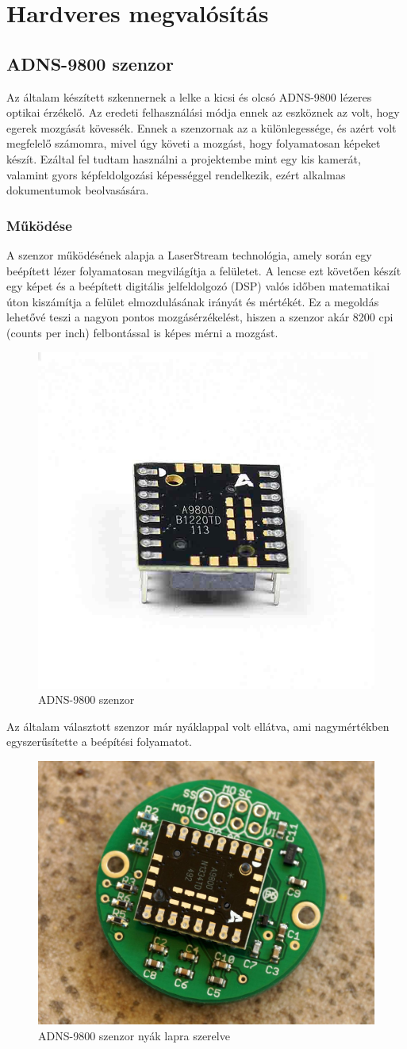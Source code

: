 \documentclass[]{thesis-ekf}
\theoremstyle{definition}
\theoremstyle{remark}
\begin{document}
\chapter{Hardveres megvalósítás}
\section{ADNS-9800 szenzor}
Az általam készített szkennernek a lelke a kicsi és olcsó ADNS-9800\cite{adns9800} lézeres optikai érzékelő. Az eredeti felhasználási módja ennek az eszköznek az volt, hogy egerek mozgását kövessék. Ennek a szenzornak az a különlegessége, és azért volt megfelelő számomra, mivel úgy követi a mozgást, hogy folyamatosan képeket készít. Ezáltal fel tudtam használni a projektembe mint egy kis kamerát, valamint gyors képfeldolgozási képességgel rendelkezik, ezért alkalmas dokumentumok beolvasására. 
\subsection{Működése}
 A szenzor működésének alapja a LaserStream technológia, amely során egy beépített lézer folyamatosan megvilágítja a felületet. A lencse ezt követően készít egy képet és a beépített digitális jelfeldolgozó (DSP) valós időben matematikai úton kiszámítja a felület elmozdulásának irányát és mértékét. Ez a megoldás lehetővé teszi a nagyon pontos mozgásérzékelést, hiszen a szenzor akár 8200 cpi (counts per inch) felbontással is képes mérni a mozgást.
\begin{figure}[th!]
	\centering
	\includegraphics[width=0.35\linewidth]{ADNS9800base}
	\caption[ADNS9800]{ADNS-9800 szenzor}
	\label{fig:adns9800base}
\end{figure}

Az általam választott szenzor már nyáklappal volt ellátva, ami nagymértékben egyszerűsítette a beépítési folyamatot. 

\begin{figure}[th!]
	\centering
	\includegraphics[width=0.3\linewidth]{ADNS9800}
	\caption[ADNS9800]{ADNS-9800 szenzor nyák lapra szerelve}
	\label{fig:adns9800}
\end{figure}
\end{document}
